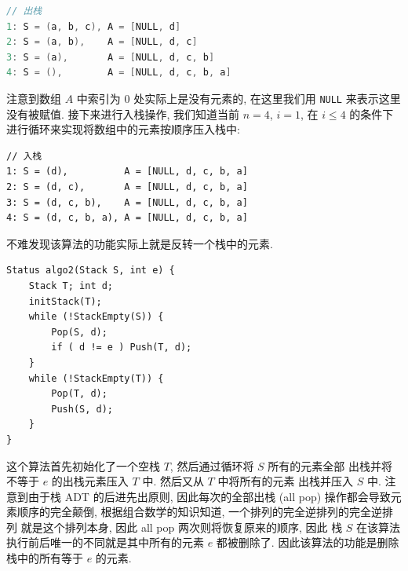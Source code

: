 \documentclass[10pt,UTF8]{book} %
\begin{document}
\begin{exercise}
\begin{cmt}
\begin{lstlisting}[language=C]
// 出栈
1: S = (a, b, c), A = [NULL, d]
2: S = (a, b),    A = [NULL, d, c]
3: S = (a),       A = [NULL, d, c, b]
4: S = (),        A = [NULL, d, c, b, a]
        \end{lstlisting}
        注意到数组 $A$ 中索引为 $0$ 处实际上是没有元素的,
        在这里我们用 \lstinline|NULL| 来表示这里没有被赋值.
        接下来进行入栈操作, 我们知道当前 $n=4$, $i=1$, 在 $i \leqslant 4$
        的条件下进行循环来实现将数组中的元素按顺序压入栈中:
\begin{lstlisting}
// 入栈
1: S = (d),          A = [NULL, d, c, b, a]
2: S = (d, c),       A = [NULL, d, c, b, a]
3: S = (d, c, b),    A = [NULL, d, c, b, a]
4: S = (d, c, b, a), A = [NULL, d, c, b, a]
\end{lstlisting}
        不难发现该算法的功能实际上就是反转一个栈中的元素.
    \end{cmt}
\begin{lstlisting}
Status algo2(Stack S, int e) {
    Stack T; int d;
    initStack(T);
    while (!StackEmpty(S)) {
        Pop(S, d);
        if ( d != e ) Push(T, d);
    }
    while (!StackEmpty(T)) {
        Pop(T, d);
        Push(S, d);
    }
}
\end{lstlisting}
\begin{cmt}
    这个算法首先初始化了一个空栈 $T$, 然后通过循环将 $S$ 所有的元素全部
    出栈并将不等于 $e$ 的出栈元素压入 $T$ 中. 然后又从 $T$ 中将所有的元素
    出栈并压入 $S$ 中. 注意到由于栈 ADT 的后进先出原则, 因此每次的全部出栈 (all pop)
    操作都会导致元素顺序的完全颠倒, 根据组合数学的知识知道,
    一个排列的完全逆排列的完全逆排列
    就是这个排列本身, 因此 all pop 两次则将恢复原来的顺序,
    因此 栈 $S$  在该算法执行前后唯一的不同就是其中所有的元素 $e$
    都被删除了. 因此该算法的功能是删除栈中的所有等于 $e$ 的元素.
\end{cmt}
\end{exercise}


\end{document}
